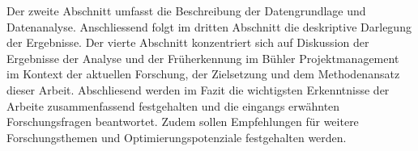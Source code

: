 \newline\newline
Der zweite Abschnitt umfasst die Beschreibung der Datengrundlage und Datenanalyse. Anschliessend folgt im dritten Abschnitt die deskriptive Darlegung der Ergebnisse. Der vierte Abschnitt konzentriert sich auf Diskussion der Ergebnisse der Analyse und der Früherkennung im Bühler Projektmanagement im Kontext der aktuellen Forschung, der Zielsetzung und dem Methodenansatz dieser Arbeit.
\newline\newline
Abschliesend werden im Fazit die wichtigsten Erkenntnisse der Arbeite zusammenfassend festgehalten und die eingangs erwähnten Forschungsfragen beantwortet. Zudem sollen Empfehlungen für weitere Forschungsthemen und Optimierungspotenziale festgehalten werden.

	




